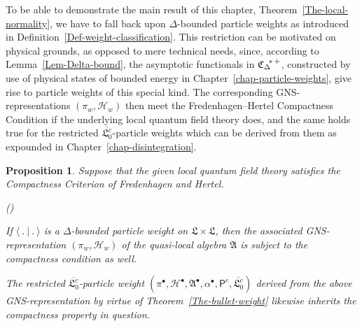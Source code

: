 \documentclass[11pt,twoside,openright]{report}
\theoremstyle{definition}
\theoremstyle{plain}
\newtheorem{Pro}[Def]{Proposition}
\theoremstyle{remark}
\theoremstyle{assumption}
\newcommand{\scp}[2]{\langle #1 \vert #2 \rangle}
\newcommand{\Afrak}{\mathfrak{A}}
\newcommand{\Lfrak}{\mathfrak{L}}
\newcommand{\Hscr}{\mathscr{H}}
\newcommand{\CDstarplus}{{\mathfrak{C}_\Delta}^{\negthickspace *
    \thinspace +}}
\newcommand{\Pcount}{\mathsf{P}^c}
\newcommand{\vaccountbar}{\overline{\mathfrak{L}_0^c}}
\newcommand{\Hbullet}{\mathscr{H}^\bullet}
\newcommand{\Abullet}{\mathfrak{A}^\bullet}
\newcounter{propitem}
\newenvironment{proplist}{\begin{list}{(\roman{propitem})}%
  {\usecounter{propitem} \setlength{\topsep}{0ex}%
   \setlength{\parsep}{0.2ex} \setlength{\itemsep}{0.4ex}%
   \setlength{\leftmargin}{0em} \setlength{\itemindent}{0.5em}%
   }}{\end{list}}
\begin{document}
To be able to demonstrate the main result of this chapter,
Theorem~\ref{The-local-normality}, we have to fall back upon
$\Delta$-bounded particle weights as introduced in
Definition~\ref{Def-weight-classification}. This restriction can be
motivated on physical grounds, as opposed to mere technical needs,
since, according to Lemma~\ref{Lem-Delta-bound}, the asymptotic
functionals in $\CDstarplus$, constructed by use of physical states of
bounded energy in Chapter~\ref{chap-particle-weights}, give rise to
particle weights of this special kind. The corresponding
GNS-representations $( \pi_w , \Hscr_w )$ then meet the
Fredenhagen--Hertel Compactness Condition if the underlying local
quantum field theory does, and the same holds true for the restricted
$\vaccountbar$-particle weights which can be derived from them as
expounded in Chapter~\ref{chap-disintegration}.
\begin{Pro}
  \label{Pro-weight-precompactness}
  Suppose that the given local quantum field theory satisfies the
  Compactness Criterion of Fredenhagen and Hertel.
  \begin{proplist}
  \item If $\scp{~.~}{~.~}$ is a $\Delta$-bounded particle weight on
    $\Lfrak \times \Lfrak$, then the associated GNS-representation $(
    \pi_w , \Hscr_w )$ of the quasi-local algebra $\Afrak$ is subject
    to the compactness condition as well.
  \item The restricted $\vaccountbar$-particle weight $( \pi^\bullet ,
    \Hbullet , \Abullet , \alpha^\bullet , \Pcount , \vaccountbar)$
    derived from the above GNS-representation by virtue of
    Theorem~\ref{The-bullet-weight} likewise inherits the compactness
    property in question.
  \end{proplist}
\end{Pro}
\end{document}
